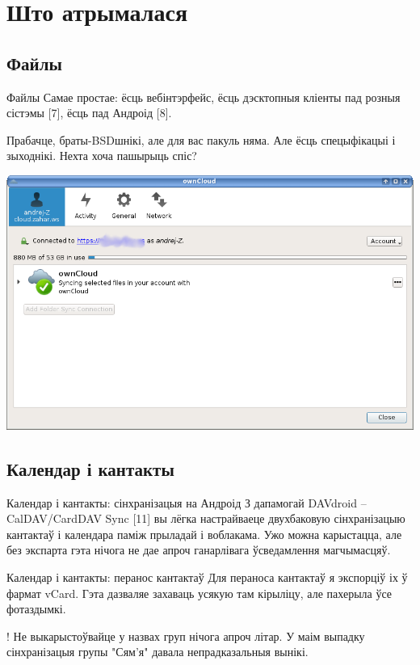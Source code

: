 \documentclass[ignorenonframetext,hyperref={pdftex,unicode}]{beamer}
\begin{document}
\section{Што атрымалася}
\subsection{Файлы}
\begin{frame}{Файлы}
	Самае простае: ёсць вебінтэрфейс, ёсць дэсктопныя кліенты пад розныя сістэмы [7], ёсць пад Андроід [8]. 

	Прабачце, браты-BSDшнікі, але для вас пакуль няма. Але ёсць спецыфікацыі і зыходнікі. Нехта хоча пашырыць спіс?
	
	\begin{center}
 		\includegraphics[height=0.4\textheight,keepaspectratio]{d_client}
	\end{center}
\end{frame}

\subsection{Календар і кантакты}
\begin{frame}{Календар і кантакты: сінхранізацыя на Андроід}
	З дапамогай DAVdroid – CalDAV/CardDAV Sync [11] вы лёгка настрайваеце двухбаковую сінхранізацыю кантактаў і календара паміж прыладай і воблакама. Ужо можна карыстацца, але без экспарта гэта нічога не дае апроч ганарлівага ўсведамлення магчымасцяў.
\end{frame}

\begin{frame}{Календар і кантакты: перанос кантактаў}
	Для пераноса кантактаў я экспорціў іх ў фармат vCard. Гэта дазваляе захаваць усякую там кірыліцу, але пахерыла ўсе фотаздымкі.

	{!} Не выкарыстоўвайце у назвах груп нічога апроч літар. У маім выпадку сінхранізацыя групы "Сям'я" давала непрадказальныя вынікі.
\end{frame}
\end{document}
